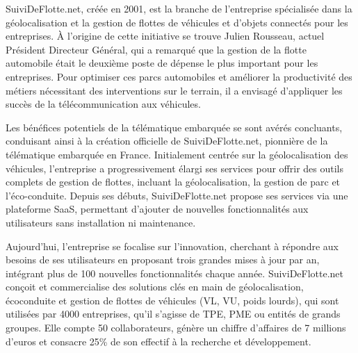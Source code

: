 SuiviDeFlotte.net, créée en 2001, est la branche de l'entreprise spécialisée dans la géolocalisation et la gestion de flottes de véhicules et d'objets connectés pour les entreprises. À l'origine de cette initiative se trouve Julien Rousseau, actuel Président Directeur Général, qui a remarqué que la gestion de la flotte automobile était le deuxième poste de dépense le plus important pour les entreprises. Pour optimiser ces parcs automobiles et améliorer la productivité des métiers nécessitant des interventions sur le terrain, il a envisagé d'appliquer les succès de la télécommunication aux véhicules.

Les bénéfices potentiels de la télématique embarquée se sont avérés concluants, conduisant ainsi à la création officielle de SuiviDeFlotte.net, pionnière de la télématique embarquée en France. Initialement centrée sur la géolocalisation des véhicules, l'entreprise a progressivement élargi ses services pour offrir des outils complets de gestion de flottes, incluant la géolocalisation, la gestion de parc et l'éco-conduite. Depuis ses débuts, SuiviDeFlotte.net propose ses services via une plateforme SaaS, permettant d'ajouter de nouvelles fonctionnalités aux utilisateurs sans installation ni maintenance.

Aujourd'hui, l'entreprise se focalise sur l'innovation, cherchant à répondre aux besoins de ses utilisateurs en proposant trois grandes mises à jour par an, intégrant plus de 100 nouvelles fonctionnalités chaque année. SuiviDeFlotte.net conçoit et commercialise des solutions clés en main de géolocalisation, écoconduite et gestion de flottes de véhicules (VL, VU, poids lourds), qui sont utilisées par 4000 entreprises, qu'il s'agisse de TPE, PME ou entités de grands groupes. Elle compte 50 collaborateurs, génère un chiffre d'affaires de 7 millions d'euros et consacre 25\% de son effectif à la recherche et développement.